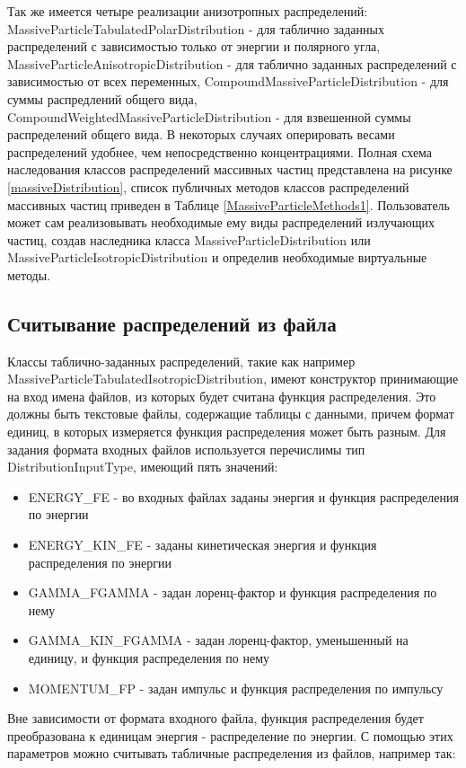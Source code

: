 Так же имеется четыре реализации анизотропных распределений: MassiveParticleTabulatedPolarDistribution - для таблично заданных распределений с зависимостью только от энергии и полярного угла, MassiveParticleAnisotropicDistribution - для таблично заданных распределений с зависимостью от всех переменных, CompoundMassiveParticleDistribution - для суммы распредлений общего вида, CompoundWeightedMassiveParticleDistribution - для взвешенной суммы распределений общего вида. В некоторых случаях оперировать весами распределений удобнее, чем непосредственно концентрациями. Полная схема наследования классов распределений массивных частиц представлена на рисунке \ref{massiveDistribution}, список публичных методов классов распределений массивных частиц приведен в Таблице \ref{MassiveParticleMethods1}. Пользователь может сам реализовывать необходимые ему виды распределений излучающих частиц, создав наследника класса MassiveParticleDistribution или MassiveParticleIsotropicDistribution и определив необходимые виртуальные методы.

\subsection{Считывание распределений из файла}
Классы таблично-заданных распределений, такие как например MassiveParticleTabulatedIsotropicDistribution, имеют конструктор принимающие на вход имена файлов, из которых будет считана функция распределения. Это должны быть текстовые файлы, содержащие таблицы с данными, причем формат единиц, в которых измеряется функция распределения может быть разным. Для задания формата входных файлов используется перечислимы тип DistributionInputType, имеющий пять значений:

\begin{itemize}
	\item ENERGY\_FE - во входных файлах заданы энергия и функция распределения по энергии
	\item ENERGY\_KIN\_FE - заданы кинетическая энергия и функция распределения по энергии
	\item GAMMA\_FGAMMA - задан лоренц-фактор и функция распределения по нему
	\item GAMMA\_KIN\_FGAMMA - задан лоренц-фактор, уменьшенный на единицу, и функция распределения по нему
	\item MOMENTUM\_FP - задан импульс и функция распределения по импульсу
\end{itemize}

Вне зависимости от формата входного файла, функция распределения будет преобразована к единицам энергия - распределение по энергии. С помощью этих параметров можно считывать табличные распределения из файлов, например так:

